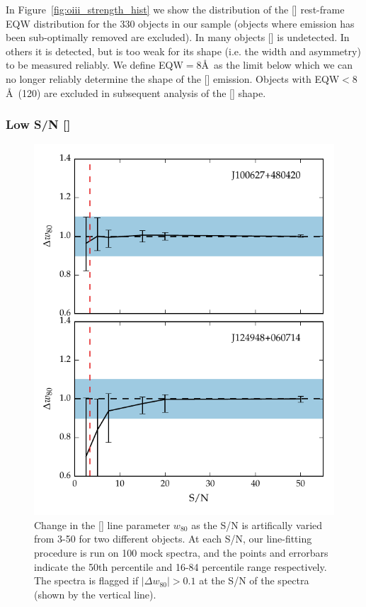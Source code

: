 In Figure~\ref{fig:oiii_strength_hist} we show the distribution of the [] rest-frame \ac{EQW} distribution for the 330 objects in our sample (objects where  emission has been sub-optimally removed are excluded). 
In many objects [] is undetected. 
In others it is detected, but is too weak for its shape (i.e. the width and asymmetry) to be measured reliably. 
We define \ac{EQW}$=8$\AA\, as the limit below which we can no longer reliably determine the shape of the [] emission. 
Objects with \ac{EQW}$<8$\AA\, (120) are excluded in subsequent analysis of the [] shape.  

\subsubsection{Low \ac{S/N} []}
 
\begin{figure}
    \centering
    \includegraphics[width=0.7\columnwidth]{figures/chapter04/snr_test.pdf} 
    \caption{Change in the [] line parameter $w_{80}$ as the \ac{S/N} is artifically varied from 3-50 for two different objects. At each \ac{S/N}, our line-fitting procedure is run on 100 mock spectra, and the points and errorbars indicate the 50th percentile and 16-84 percentile range respectively. The spectra is flagged if $|\Delta w_{80}|>0.1$ at the \ac{S/N} of the spectra (shown by the vertical line).}
    \label{fig:snr_test}
\end{figure}

